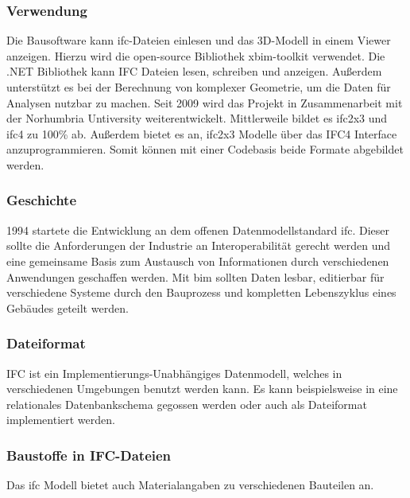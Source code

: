 \subsubsection{Verwendung}

Die Bausoftware kann \ac{ifc}-Dateien einlesen und das 3D-Modell in einem Viewer anzeigen. Hierzu wird die open-source Bibliothek xbim-toolkit verwendet. Die .NET Bibliothek kann IFC Dateien lesen, schreiben und anzeigen. Außerdem unterstützt es bei der Berechnung von komplexer Geometrie, um die Daten für Analysen nutzbar zu machen. Seit 2009 wird das Projekt in Zusammenarbeit mit der Norhumbria Untiversity weiterentwickelt. Mittlerweile bildet es \ac{ifc2x3} und \ac{ifc4} zu 100\% ab. Außerdem bietet es an, \ac{ifc2x3} Modelle über das IFC4 Interface anzuprogrammieren. Somit können mit einer Codebasis beide Formate abgebildet werden. \cite{xbim}



\subsubsection{Geschichte}

1994 startete die Entwicklung an dem offenen Datenmodellstandard \ac{ifc}. Dieser sollte die Anforderungen der Industrie an Interoperabilität gerecht werden und eine gemeinsame Basis zum Austausch von Informationen durch verschiedenen Anwendungen geschaffen werden. Mit \ac{bim} sollten Daten lesbar, editierbar für verschiedene Systeme durch den Bauprozess und kompletten Lebenszyklus eines Gebäudes geteilt werden. \cite{Laakso2012-oi}

\subsubsection{Dateiformat}

IFC ist ein Implementierungs-Unabhängiges Datenmodell, welches in verschiedenen Umgebungen benutzt werden kann. Es kann beispielsweise in eine relationales Datenbankschema gegossen werden oder auch als Dateiformat implementiert werden. \cite{Laakso2012-oi}



\subsubsection{Baustoffe in IFC-Dateien}
Das \ac{ifc} Modell bietet auch Materialangaben zu verschiedenen Bauteilen an. \cite{IFC4_doc}

